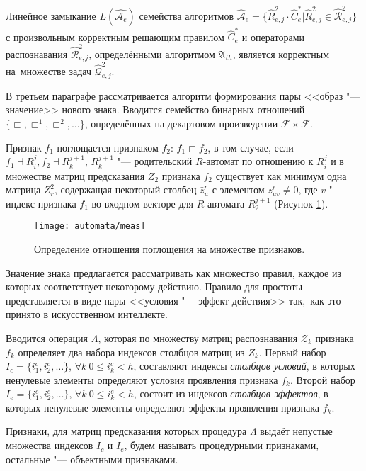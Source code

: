 \begin{Theorem}\label{th:hier_correct}
	Линейное замыкание $L(\hat{\mathcal A_e})$ семейства алгоритмов $\hat{\mathcal A}_e=\{\hat R_{e,j}^2\cdot\hat C_e^*|\hat R_{e,j}^2\in\hat{\mathcal R}_{e,j}^2\}$ с произвольным корректным решающим правилом $\hat C_e^*$ и операторами распознавания $\hat{\mathcal R}_{e,j}^2$, определёнными алгоритмом $\mathfrak A_{th}$, является корректным на~множестве задач $\hat{\mathcal Q}_{e,j}^2$.
\end{Theorem}

В третьем параграфе рассматривается алгоритм формирования пары <<образ "--- значение>> нового знака. Вводится семейство бинарных отношений $\{\sqsubset,\sqsubset^1,\sqsubset^2,\dots\}$, определённых на декартовом произведении $\mathcal F\times\mathcal F$. 

Признак $f_1$ поглощается признаком $f_2$: $f_1\sqsubset f_2$, в том случае, если $f_1\dashv R_i^j, f_2\dashv R_k^{j+1}$, $R_k^{j+1}$ "--- родительский $R$-автомат по отношению к $R_i^j$ и в множестве матриц предсказания $Z_2$ признака $f_2$ существует как минимум одна матрица $Z_r^2$, содержащая некоторый столбец $\bar z_u^r$ с элементом $z_{uv}^r\not=0$, где $v$ "--- индекс признака $f_1$ во входном векторе для $R$-автомата $R_2^{j+1}$ (Рисунок \ref{fig:rb_measure}).

\begin{figure}[h]
	\centering
	\texttt{[image: automata/meas]}
	\caption{Определение отношения поглощения на множестве признаков.}
	\label{fig:rb_measure}
\end{figure}

Значение знака предлагается рассматривать как множество правил, каждое из которых соответствует некоторому действию. Правило для простоты представляется в виде пары <<условия "--- эффект действия>> так,~как это принято в искусственном интеллекте. 

Вводится операция $\Lambda$, которая по множеству матриц распознавания $\mathcal Z_k$ признака $f_k$ определяет два набора индексов столбцов матриц из $Z_k$. Первый набор $I_c=\{i_1^c,i_2^c,\dots\}$, $\forall k\ 0\leqslant i_k^c < h$, составляют индексы \textit{столбцов условий}, в которых ненулевые элементы определяют условия проявления признака $f_k$. Второй набор $I_e=\{i_1^e,i_2^e,\dots\}$, $\forall k\ 0\leqslant i_k^e < h$, состоит из индексов  \textit{столбцов эффектов}, в которых ненулевые элементы определяют эффекты проявления признака $f_k$. 

\begin{Def}
	Признаки, для матриц предсказания которых процедура $\Lambda$ выдаёт непустые множества индексов $I_c$ и $I_e$, будем называть процедурными признаками, остальные "--- объектными признаками.
\end{Def}

